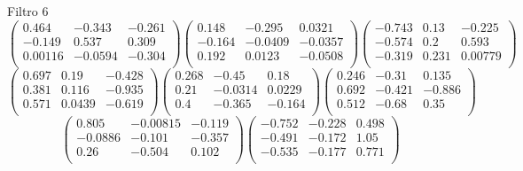Filtro 6
{ \small
\[
\begin{pmatrix}
  0.464 & -0.343 & -0.261 \\
  -0.149 & 0.537 & 0.309 \\
  0.00116 & -0.0594 & -0.304 \\
\end{pmatrix}
\begin{pmatrix}
  0.148 & -0.295 & 0.0321 \\
  -0.164 & -0.0409 & -0.0357 \\
  0.192 & 0.0123 & -0.0508 \\
\end{pmatrix}
\begin{pmatrix}
  -0.743 & 0.13 & -0.225 \\
  -0.574 & 0.2 & 0.593 \\
  -0.319 & 0.231 & 0.00779 \\
\end{pmatrix}
\]
\[
\begin{pmatrix}
  0.697 & 0.19 & -0.428 \\
  0.381 & 0.116 & -0.935 \\
  0.571 & 0.0439 & -0.619 \\
\end{pmatrix}
\begin{pmatrix}
  0.268 & -0.45 & 0.18 \\
  0.21 & -0.0314 & 0.0229 \\
  0.4 & -0.365 & -0.164 \\
\end{pmatrix}
\begin{pmatrix}
  0.246 & -0.31 & 0.135 \\
  0.692 & -0.421 & -0.886 \\
  0.512 & -0.68 & 0.35 \\
\end{pmatrix}
\]
\[
\begin{pmatrix}
  0.805 & -0.00815 & -0.119 \\
  -0.0886 & -0.101 & -0.357 \\
  0.26 & -0.504 & 0.102 \\
\end{pmatrix}
\begin{pmatrix}
  -0.752 & -0.228 & 0.498 \\
  -0.491 & -0.172 & 1.05 \\
  -0.535 & -0.177 & 0.771 \\
\end{pmatrix}
\]
}

